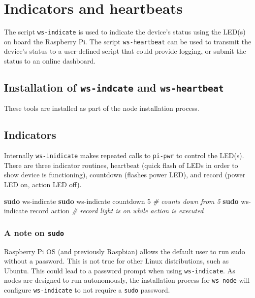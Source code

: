 \documentclass[
]{book}
\newenvironment{Shaded}{\begin{snugshade}}{\end{snugshade}}
\newcommand{\CommentTok}[1]{\textcolor[rgb]{0.56,0.35,0.01}{\textit{#1}}}
\newcommand{\FunctionTok}[1]{\textcolor[rgb]{0.13,0.29,0.53}{\textbf{#1}}}
\newcommand{\NormalTok}[1]{#1}
\begin{document}
\chapter{Indicators and heartbeats}\label{indicators-and-heartbeats}

The script \texttt{ws-indicate} is used to indicate the device's status using the LED(s) on board the Raspberry Pi. The script \texttt{ws-heartbeat} can be used to transmit the device's status to a user-defined script that could provide logging, or submit the status to an online dashboard.

\section{\texorpdfstring{Installation of \texttt{ws-indcate} and \texttt{ws-heartbeat}}{Installation of ws-indcate and ws-heartbeat}}\label{installation-of-ws-indcate-and-ws-heartbeat}

These tools are installed as part of the node installation process.

\section{Indicators}\label{indicators}

Internally \texttt{ws-inidicate} makes repeated calls to \texttt{pi-pwr} to control the LED(s). There are three indicator routines, heartbeat (quick flash of LEDs in order to show device is functioning), countdown (flashes power LED), and record (power LED on, action LED off).

\begin{Shaded}
\begin{Highlighting}[]
\FunctionTok{sudo}\NormalTok{ ws{-}indicate}
\FunctionTok{sudo}\NormalTok{ ws{-}indicate countdown 5   }\CommentTok{\# counts down from 5}
\FunctionTok{sudo}\NormalTok{ ws{-}indicate record action }\CommentTok{\# record light is on while action is executed}
\end{Highlighting}
\end{Shaded}

\subsection{\texorpdfstring{A note on \texttt{sudo}}{A note on sudo}}\label{a-note-on-sudo-1}

Raspberry Pi OS (and previously Raspbian) allows the default user to run sudo without a password. This is not true for other Linux distributions, such as Ubuntu. This could lead to a password prompt when using \texttt{ws-indicate}. As nodes are designed to run autonomously, the installation process for \texttt{ws-node} will configure \texttt{ws-indicate} to not require a \texttt{sudo} password.
\end{document}
